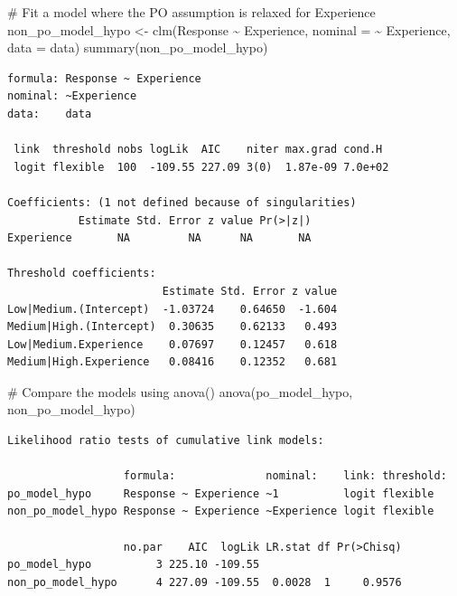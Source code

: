 \documentclass[
  letterpaper,
  DIV=11,
  numbers=noendperiod]{scrartcl}
\newenvironment{Shaded}{\begin{snugshade}}{\end{snugshade}}
\newcommand{\AttributeTok}[1]{\textcolor[rgb]{0.40,0.45,0.13}{#1}}
\newcommand{\CommentTok}[1]{\textcolor[rgb]{0.37,0.37,0.37}{#1}}
\newcommand{\FunctionTok}[1]{\textcolor[rgb]{0.28,0.35,0.67}{#1}}
\newcommand{\NormalTok}[1]{\textcolor[rgb]{0.00,0.23,0.31}{#1}}
\newcommand{\OtherTok}[1]{\textcolor[rgb]{0.00,0.23,0.31}{#1}}
\newcommand{\SpecialCharTok}[1]{\textcolor[rgb]{0.37,0.37,0.37}{#1}}
\begin{document}
\begin{Shaded}
\begin{Highlighting}[]
\CommentTok{\# Fit a model where the PO assumption is relaxed for \textquotesingle{}Experience\textquotesingle{}}
\NormalTok{non\_po\_model\_hypo }\OtherTok{\textless{}{-}} \FunctionTok{clm}\NormalTok{(Response }\SpecialCharTok{\textasciitilde{}}\NormalTok{ Experience, }\AttributeTok{nominal =} \SpecialCharTok{\textasciitilde{}}\NormalTok{ Experience, }\AttributeTok{data =}\NormalTok{ data)}
\FunctionTok{summary}\NormalTok{(non\_po\_model\_hypo) }
\end{Highlighting}
\end{Shaded}

\begin{verbatim}
formula: Response ~ Experience
nominal: ~Experience
data:    data

 link  threshold nobs logLik  AIC    niter max.grad cond.H 
 logit flexible  100  -109.55 227.09 3(0)  1.87e-09 7.0e+02

Coefficients: (1 not defined because of singularities)
           Estimate Std. Error z value Pr(>|z|)
Experience       NA         NA      NA       NA

Threshold coefficients:
                        Estimate Std. Error z value
Low|Medium.(Intercept)  -1.03724    0.64650  -1.604
Medium|High.(Intercept)  0.30635    0.62133   0.493
Low|Medium.Experience    0.07697    0.12457   0.618
Medium|High.Experience   0.08416    0.12352   0.681
\end{verbatim}

\begin{Shaded}
\begin{Highlighting}[]
\CommentTok{\# Compare the models using anova()}
\FunctionTok{anova}\NormalTok{(po\_model\_hypo, non\_po\_model\_hypo)}
\end{Highlighting}
\end{Shaded}

\begin{verbatim}
Likelihood ratio tests of cumulative link models:
 
                  formula:              nominal:    link: threshold:
po_model_hypo     Response ~ Experience ~1          logit flexible  
non_po_model_hypo Response ~ Experience ~Experience logit flexible  

                  no.par    AIC  logLik LR.stat df Pr(>Chisq)
po_model_hypo          3 225.10 -109.55                      
non_po_model_hypo      4 227.09 -109.55  0.0028  1     0.9576
\end{verbatim}
\end{document}
